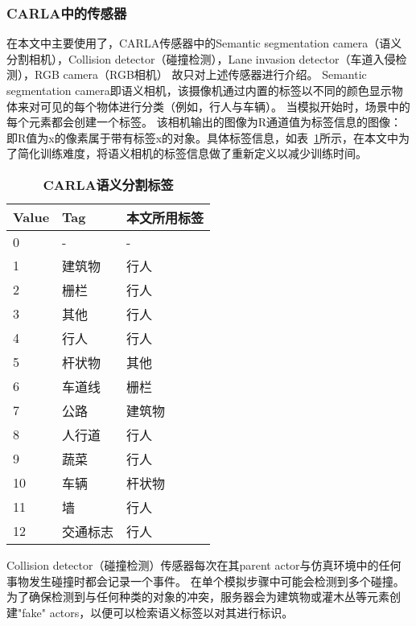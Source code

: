 \subsubsection{CARLA中的传感器}

在本文中主要使用了，CARLA传感器中的Semantic segmentation camera（语义分割相机），Collision detector（碰撞检测），Lane invasion detector（车道入侵检测），RGB camera（RGB相机）
故只对上述传感器进行介绍。
Semantic segmentation camera即语义相机，该摄像机通过内置的标签以不同的颜色显示物体来对可见的每个物体进行分类（例如，行人与车辆）。 
当模拟开始时，场景中的每个元素都会创建一个标签。
该相机输出的图像为R通道值为标签信息的图像：即R值为x的像素属于带有标签x的对象。具体标签信息，如表~\ref{tab:tab2}所示，在本文中为了简化训练难度，将语义相机的标签信息做了重新定义以减少训练时间。
\makeatletter%
\setlength{\@fptop}{5pt}
\makeatother

\begin{table}[H]
  \centering
  \caption{\textbf{CARLA语义分割标签}}
  \begin{tabular}{lll}
    \toprule
    Value          &       Tag & 本文所用标签              \\
    \midrule
    0   & - & -\\ 
    1   & 建筑物& 行人                     \\
    2 & 栅栏& 行人    \\
    3 & 其他 & 行人 \\
    4 & 行人   & 行人     \\
    5 & 杆状物   & 其他    \\
    6 & 车道线      & 栅栏  \\
    7 & 公路    & 建筑物  \\
    8 & 人行道    & 行人    \\
    9 & 蔬菜     & 行人   \\
    10 & 车辆  & 杆状物     \\
    11& 墙    & 行人  \\
    12 & 交通标志   & 行人    \\
    \bottomrule
  \end{tabular}
  \label{tab:tab2}
\end{table}

Collision detector（碰撞检测）传感器每次在其parent actor与仿真环境中的任何事物发生碰撞时都会记录一个事件。 在单个模拟步骤中可能会检测到多个碰撞。 
为了确保检测到与任何种类的对象的冲突，服务器会为建筑物或灌木丛等元素创建"fake" actors，以便可以检索语义标签以对其进行标识。


